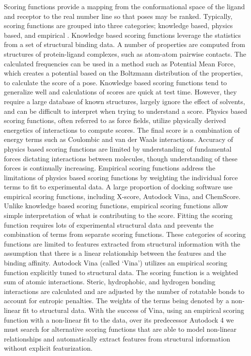 \documentclass[journal=jcisd8,manuscript=article]{achemso}
\begin{document}
Scoring functions provide a mapping from the conformational space of the ligand and receptor to the real number line so that poses may be ranked. Typically, scoring functions are grouped into three categories; knowledge based, physics based, and empirical \cite{kitchen2004docking}. Knowledge based scoring functions leverage the statistics from a set of structural binding data. A number of properties are computed from structures of protein-ligand complexes, such as atom-atom pairwise contacts. The calculated frequencies can be used in a method such as Potential Mean Force, which creates a potential based on the Boltzmann distribution of the properties, to calculate the score of a pose. Knowledge based scoring functions tend to generalize well and calculations of scores are quick at test time. However, they require a large database of known structures, largely ignore the effect of solvents, and can be difficult to interpret when trying to understand a score\cite{brooijmans2003molecular}. Physics based scoring functions, often referred to as force fields, utilize physically derived energetics of interactions to compute scores. The final score is a combination of energy terms such as Coulombic and van der Waals interactions\cite{huang2006molecular}. Accuracy of physics based scoring functions are limited by understanding of fundamental forces dictating interactions between molecules, though understanding of these forces is continually increasing\cite{liu2015classification}. Empirical scoring functions address the limitations of physics based scoring functions by weighting the individual force terms to fit to experimental data.  A large proportion of docking software use empirical scoring functions, including X-score, Autodock Vina, and ChemScore\cite{wang2002further,trott2010autodock,eldridge1997empirical}. Unlike knowledge based scoring functions, empirical scoring functions allow simple interpretation of what is contributing to the score. Fitting the scoring function requires lots of experimental structural data and prevents the combination of terms from separate scoring functions. These categories of scoring functions are limited to features extracted from structural information with the assumption that there is a linear relationship between the features and the binding affinity. Autodock Vina (called `Vina') utilizes an empirical scoring function explicitly tuned to structural data\cite{trott2010autodock}. The scoring function is a weighted sum of atomic interactions.  Steric, hydrophobic, and hydrogen bonding interactions are calculated and are adjusted by the number of rotatable bonds to account for entropic penalties.  The weights of the terms being denoted by a non-linear fit to structural data. With the success of Vina, using an empirical scoring function with a non-linear fit to the data,  over its predecessor Autodock 4\cite{morris1998automated} we must search for alternative scoring functions that are able to model non-linear relationships and automatically extract features from structural information without explicit featurization.
\end{document}

